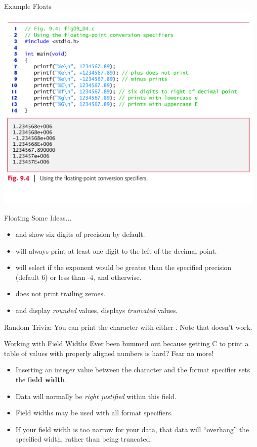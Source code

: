 \documentclass[11pt]{beamer}
\let\OldTexttt\texttt
\renewcommand{\texttt}[1]{\OldTexttt{\color{teal}{#1}}}
\begin{document}
\begin{frame}{Example Floats}
\center
\includegraphics[scale=0.34]{floatsExample.png}
\end{frame}

\begin{frame}{Floating Some Ideas...}
\begin{itemize}
\item \texttt{e} and \texttt{f} show six digits of precision by default.
\item \texttt{f} will always print at least one digit to the left of the decimal point.  
\item \texttt{g} will select \texttt{e} if the exponent would be greater than the specified precision (default 6) or less than -4, and \texttt{f} otherwise. 
\item \texttt{g} does not print trailing zeroes.  
\item \texttt{e} and \texttt{g} display \emph{rounded} values, \texttt{f} displays \emph{truncated} values.  
\end{itemize}
Random Trivia: You can print the \texttt{\%} character with either \texttt{\%\%}.  Note that \texttt{\textbackslash \%} doesn't work.
\end{frame}

\begin{frame}{Working with Field Widths}
Ever been bummed out because getting C to print a table of values with properly aligned numbers is hard?  Fear no more! 
\begin{itemize}
\item Inserting an integer value between the \texttt{\%} character and the format specifier sets the \textbf{field width}. 
\item Data will normally be \emph{right justified} within this field. 
\item Field widths may be used with all format specifiers.  
\item If your field width is too narrow for your data, that data will ``overhang'' the specified width, rather than being truncated.  
\end{itemize}
\end{frame}
\end{document}
